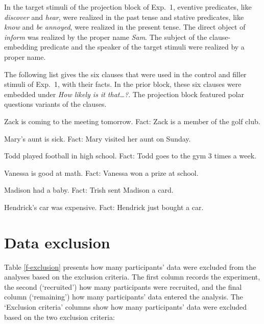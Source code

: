 \documentclass[11pt,fleqn]{article}
\newcommand{\6}{\mbox{$[\hspace*{-.6mm}[$}}
\newcommand{\9}{\mbox{$]\hspace*{-.6mm}]$}}
\begin{document}
In the target stimuli of the projection block of Exp.~1, eventive predicates, like {\em discover} and {\em hear}, were realized in the past tense and stative predicates, like {\em know} and {\em be annoyed}, were realized in the present tense. The direct object of {\em inform} was realized by the proper name {\em Sam}. The subject of the clause-embedding predicate and the speaker of the target stimuli were realized by a proper name. 

The following list gives the six clauses that were used in the control and filler stimuli of Exp.~1, with their facts. In the prior block, these six clauses were embedded under {\em How likely is it that\ldots?}. The projection block featured polar questions variants of the clauses.

\begin{enumerate}[leftmargin=3ex,itemsep=-2pt]
\ex Zack is coming to the meeting tomorrow. Fact: Zack is a member of the golf club. 

\ex Mary's aunt is sick. Fact: Mary visited her aunt on Sunday. 

\ex Todd played football in high school. Fact: Todd goes to the gym 3 times a week. 

\ex Vanessa is good at math. Fact: Vanessa won a prize at school. 

\ex Madison had a baby. Fact: Trish sent Madison a card. 

\ex Hendrick's car was expensive. Fact: Hendrick just bought a car. 
\end{enumerate}

\section{Data exclusion}\label{a-exclusion}

Table \ref{f-exclusion} presents how many participants' data were excluded from the analyses based on the exclusion criteria. The first column records the experiment, the second (`recruited') how many participants were recruited, and the final column (`remaining') how many participants' data entered the analysis. The `Exclusion criteria' columns show how many participants' data were excluded based on the two exclusion criteria: 
\end{document}
